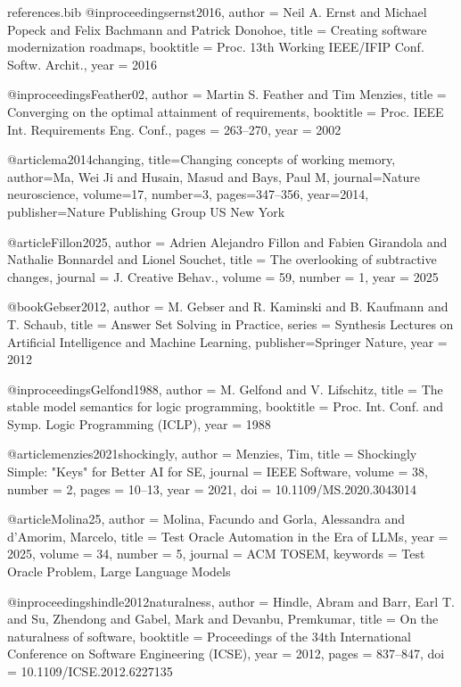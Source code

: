 \documentclass[runningheads]{llncs}
\begin{document}
\begin{filecontents}{references.bib}
@inproceedings{ernst2016,
  author    = {Neil A. Ernst and Michael Popeck and Felix Bachmann and Patrick Donohoe},
  title     = {Creating software modernization roadmaps},
  booktitle = {Proc. 13th Working IEEE/IFIP Conf. Softw. Archit.},
  year      = {2016}
}



@inproceedings{Feather02,
  author    = {Martin S. Feather and Tim Menzies},
  title     = {Converging on the optimal attainment of requirements},
  booktitle = {Proc. IEEE Int. Requirements Eng. Conf.},
  pages     = {263--270},
  year      = {2002}
}


@article{ma2014changing,
  title={Changing concepts of working memory},
  author={Ma, Wei Ji and Husain, Masud and Bays, Paul M},
  journal={Nature neuroscience},
  volume={17},
  number={3},
  pages={347--356},
  year={2014},
  publisher={Nature Publishing Group US New York}
}


@article{Fillon2025,
  author  = {Adrien Alejandro Fillon and Fabien Girandola and Nathalie Bonnardel and Lionel Souchet},
  title   = {The overlooking of subtractive changes},
  journal = {J. Creative Behav.},
  volume  = {59},
  number  = {1},
  year    = {2025}
}



@book{Gebser2012,
  author    = {M. Gebser and R. Kaminski and B. Kaufmann and T. Schaub},
  title     = {Answer Set Solving in Practice},
  series    = {Synthesis Lectures on Artificial Intelligence and Machine Learning},
  publisher={Springer Nature},
  year      = {2012}
}


@inproceedings{Gelfond1988,
  author    = {M. Gelfond and V. Lifschitz},
  title     = {The stable model semantics for logic programming},
  booktitle = {Proc. Int. Conf. and Symp. Logic Programming (ICLP)},
  year      = {1988}
}


@article{menzies2021shockingly,
  author = {Menzies, Tim},
  title = {Shockingly Simple: "Keys" for Better {AI} for {SE}},
  journal = {IEEE Software},
  volume = {38},
  number = {2},
  pages = {10--13},
  year = {2021},
  doi = {10.1109/MS.2020.3043014}
}

@article{Molina25,
author = {Molina, Facundo and Gorla, Alessandra and d’Amorim, Marcelo},
title = {Test Oracle Automation in the Era of LLMs},
year = {2025}, 
volume = {34},
number = {5},
journal = {ACM TOSEM},  
keywords = {Test Oracle Problem, Large Language Models}
}


@inproceedings{hindle2012naturalness,
  author = {Hindle, Abram and Barr, Earl T. and Su, Zhendong and Gabel, Mark and Devanbu, Premkumar},
  title = {On the naturalness of software},
  booktitle = {Proceedings of the 34th International Conference on Software Engineering (ICSE)},
  year = {2012},
  pages = {837--847},
  doi = {10.1109/ICSE.2012.6227135}
}


\end{filecontents}
\end{document}

